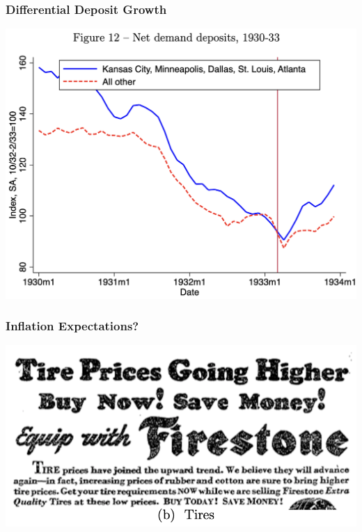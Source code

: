 \documentclass[english,xcolor=svgnames]{beamer}
\begin{document}
\begin{frame}
\frametitle[alignment=center]{Differential Deposit Growth}
\centering
\includegraphics[scale=0.5]{figures/HRWFIG12.png}
\end{frame}

\begin{frame}
\frametitle[alignment=center]{Inflation Expectations?}
\centering
\includegraphics[scale=0.5]{figures/HRWFIG14b.png}
\end{frame}
\end{document}
